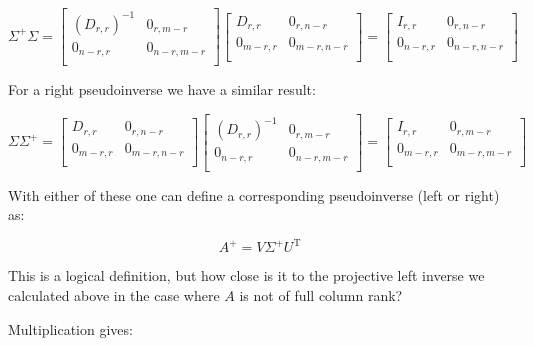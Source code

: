 \documentclass{article}      %
\newcommand{\T}[0]{\text{T}}
\begin{document}
\[
\Sigma^{+} \Sigma
=
\begin{bmatrix}
(D_{r,r})^{-1} & 0_{r,m-r} \\
0_{n-r,r} & 0_{n-r,m-r} \\
\end{bmatrix}
\begin{bmatrix}
D_{r,r} & 0_{r,n-r} \\
0_{m-r,r} & 0_{m-r,n-r} \\
\end{bmatrix}
=
\begin{bmatrix}
I_{r,r} & 0_{r,n-r} \\
0_{n-r,r} & 0_{n-r,n-r} \\
\end{bmatrix}
\]

For a right pseudoinverse we have a similar result:

\[
\Sigma
\Sigma^{+}
=
\begin{bmatrix}
D_{r,r} & 0_{r,n-r} \\
0_{m-r,r} & 0_{m-r,n-r} \\
\end{bmatrix}
\begin{bmatrix}
(D_{r,r})^{-1} & 0_{r,m-r} \\
0_{n-r,r} & 0_{n-r,m-r} \\
\end{bmatrix}
=
\begin{bmatrix}
I_{r,r} & 0_{r,m-r} \\
0_{m-r,r} & 0_{m-r,m-r} \\
\end{bmatrix}
\]

With either of these one can define a corresponding pseudoinverse (left or right) as:

\begin{equation}
A^{+} = V \Sigma^{+} U^\T
\end{equation}

This is a logical definition, but how close is it to the projective
left inverse we calculated above in the case where $A$ is not of full column 
rank?

Multiplication gives: 
\end{document}
